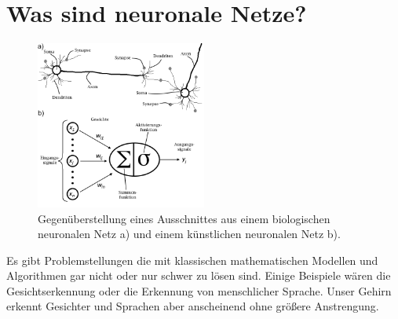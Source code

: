 

\section{Was sind neuronale Netze?}

\begin{figure}
    \centering
        \includegraphics[width=0.5\textwidth]{Bilder/BNN_ANN.png}
    \caption{Gegenüberstellung eines Ausschnittes aus einem biologischen neuronalen Netz a)\footnotemark{} und einem künstlichen neuronalen Netz b).}
    \label{fig:BNN_ANN}
\end{figure}

\addtocounter{footnote}{-1}%
\addtocounter{Hfootnote}{-1}%
\wrapfigfoot{}

Es gibt Problemstellungen die mit klassischen mathematischen Modellen und Algorithmen gar nicht oder nur schwer zu lösen sind. Einige Beispiele wären die Gesichtserkennung oder die Erkennung von menschlicher Sprache. Unser Gehirn erkennt Gesichter und Sprachen aber anscheinend ohne größere Anstrengung.


